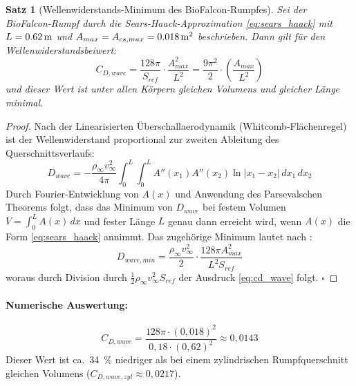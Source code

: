 ﻿\documentclass[12pt,a4paper]{article}
\newtheorem{theorem}{Satz}[section]
\theoremstyle{remark}
\begin{document}
	\begin{theorem}[Wellenwiderstands-Minimum des BioFalcon-Rumpfes]
		\label{thm:wellenwiderstand}
		Sei der BioFalcon-Rumpf durch die Sears-Haack-Approximation
		\cref{eq:sears_haack} mit $L = \SI{0{,}62}{\m}$ und
		$A_{max} = A_{cs,max} = \SI{0{,}018}{\m^2}$ beschrieben.  Dann gilt für den
		Wellenwiderstandsbeiwert:
		\begin{equation}
			C_{D,wave} = \frac{128\pi}{S_{ref}} \cdot \frac{A_{max}^2}{L^2}
			= \frac{9\pi^2}{2} \cdot \left(\frac{A_{max}}{L^2}\right)
			\label{eq:cd_wave}
		\end{equation}
		und dieser Wert ist unter allen Körpern gleichen Volumens und gleicher Länge
		minimal.
	\end{theorem}
	
	\begin{proof}
		Nach der Linearisierten Überschallaerodynamik (Whitcomb-Flächenregel) ist der
		Wellenwiderstand proportional zur zweiten Ableitung des Querschnittsverlaufs:
		\begin{equation}
			D_{wave} = -\frac{\rho_\infty v_\infty^2}{4\pi}
			\int_0^L\int_0^L A''(x_1) A''(x_2) \ln|x_1 - x_2|\, dx_1\, dx_2
			\label{eq:whitcomb_integral}
		\end{equation}
		Durch Fourier-Entwicklung von $A(x)$ und Anwendung des Parsevalschen Theorems
		folgt, dass das Minimum von $D_{wave}$ bei festem Volumen
		$V = \int_0^L A(x)\,dx$ und fester Länge $L$ genau dann erreicht wird, wenn
		$A(x)$ die Form \cref{eq:sears_haack} annimmt.  Das zugehörige Minimum lautet
		nach \cite{sears1947}:
		\begin{equation}
			D_{wave,min} = \frac{\rho_\infty v_\infty^2}{2} \cdot
			\frac{128 \pi A_{max}^2}{L^2 S_{ref}}
		\end{equation}
		woraus durch Division durch $\tfrac{1}{2}\rho_\infty v_\infty^2 S_{ref}$ der
		Ausdruck \cref{eq:cd_wave} folgt. \qquad$\square$
	\end{proof}
	
	\paragraph{Numerische Auswertung:}
	\begin{equation}
		C_{D,wave} = \frac{128\pi \cdot (0{,}018)^2}{0{,}18 \cdot (0{,}62)^2}
		\approx 0{,}0143
	\end{equation}
	Dieser Wert ist ca.\ \SI{34}{\percent} niedriger als bei einem zylindrischen
	Rumpfquerschnitt gleichen Volumens ($C_{D,wave,zyl} \approx 0{,}0217$).
	
\end{document}
